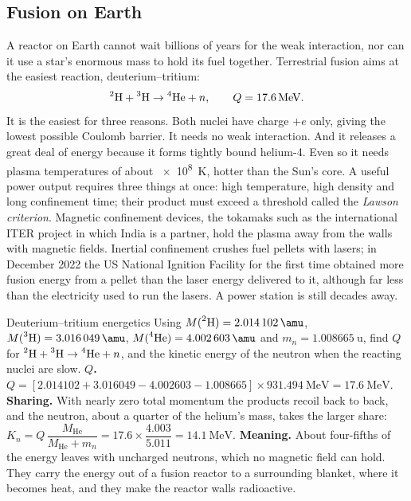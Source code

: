 \subsection{Fusion on Earth}

A reactor on Earth cannot wait billions of years for the weak interaction, nor can it use a star's
enormous mass to hold its fuel together. Terrestrial fusion aims at the easiest reaction,
deuterium--tritium:
\[
\iso{2}{H}+\iso{3}{H}\to\iso{4}{He}+n,\qquad Q=\SI{17.6}{\MeV}.
\]
It is the easiest for three reasons. Both nuclei have charge $+e$ only, giving the lowest possible Coulomb
barrier. It needs no weak interaction. And it releases a great deal of energy because it forms
tightly bound helium-4. Even so it needs plasma temperatures of about \SI{e8}{K}, hotter than the Sun's
core. A useful power output requires three things at once: high temperature, high density and long
confinement time; their product must exceed a threshold called the \emph{Lawson criterion}. Magnetic
confinement devices, the tokamaks such as the international ITER project in which India is a partner,
hold the plasma away from the walls with magnetic fields. Inertial confinement crushes fuel pellets with
lasers; in December 2022 the US National Ignition Facility for the first time obtained more fusion energy
from a pellet than the laser energy delivered to it, although far less than the electricity used to run
the lasers. A power station is still decades away.

\begin{exbox}{Deuterium--tritium energetics}\label{ex:react-dt}
Using $M(\iso{2}{H})=\SI{2.014102}{\amu}$, $M(\iso{3}{H})=\SI{3.016049}{\amu}$,
$M(\iso{4}{He})=\SI{4.002603}{\amu}$ and $m_n=\SI{1.008665}{\amu}$, find $Q$ for
$\prescript{2}{}{\mathrm{H}}+\prescript{3}{}{\mathrm{H}}\to\prescript{4}{}{\mathrm{He}}+n$, and the kinetic energy of the neutron when the reacting nuclei
are slow.
 \textbf{$Q$.} $Q=[\num{2.014102}+\num{3.016049}-\num{4.002603}-\num{1.008665}]\times\SI{931.494}{\MeV}=\SI{17.6}{\MeV}$.
 \textbf{Sharing.} With nearly zero total momentum the products recoil back to back, and the
neutron, about a quarter of the helium's mass, takes the larger share:
$K_n=Q\,\dfrac{M_{\mathrm{He}}}{M_{\mathrm{He}}+m_n}=17.6\times\dfrac{4.003}{5.011}=\SI{14.1}{\MeV}$.
 \textbf{Meaning.} About four-fifths of the energy leaves with uncharged neutrons, which no
magnetic field can hold. They carry the energy out of a fusion reactor to a surrounding blanket, where it
becomes heat, and they make the reactor walls radioactive.
\end{exbox}

